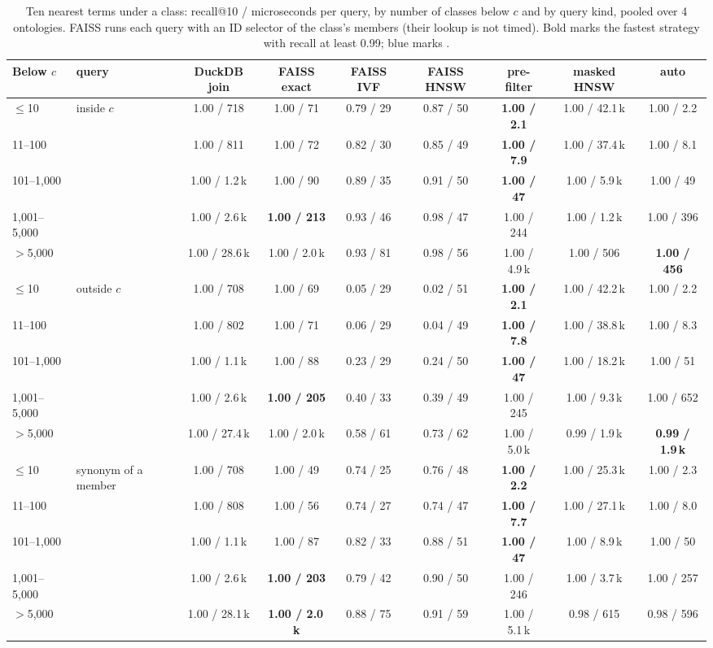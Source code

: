 \begin{table}[t]
\caption{Ten nearest terms under a class: recall@10 / microseconds per query, by number of classes below $c$ and by query kind, pooled over 4 ontologies. FAISS runs each query with an ID selector of the class's members (their lookup is not timed). Bold marks the fastest strategy with recall at least 0.99; blue marks \sys{}.}
\label{tab-filtered}
\small
\begin{tabular}{@{}llccccccc@{}}
\toprule
Below $c$ & query & DuckDB join & FAISS exact & FAISS IVF & FAISS HNSW & pre-filter & masked HNSW & auto \\
\midrule
$\le$10 & inside $c$ & 1.00 / 718 & 1.00 / 71 & 0.79 / 29 & 0.87 / 50 & \cellcolor{ours}\textbf{1.00 / 2.1} & 1.00 / 42.1\,k & 1.00 / 2.2 \\
11--100 &  & 1.00 / 811 & 1.00 / 72 & 0.82 / 30 & 0.85 / 49 & \cellcolor{ours}\textbf{1.00 / 7.9} & 1.00 / 37.4\,k & 1.00 / 8.1 \\
101--1,000 &  & 1.00 / 1.2\,k & 1.00 / 90 & 0.89 / 35 & 0.91 / 50 & \cellcolor{ours}\textbf{1.00 / 47} & 1.00 / 5.9\,k & 1.00 / 49 \\
1,001--5,000 &  & 1.00 / 2.6\,k & \textbf{1.00 / 213} & 0.93 / 46 & 0.98 / 47 & 1.00 / 244 & 1.00 / 1.2\,k & 1.00 / 396 \\
$>$5,000 &  & 1.00 / 28.6\,k & 1.00 / 2.0\,k & 0.93 / 81 & 0.98 / 56 & 1.00 / 4.9\,k & 1.00 / 506 & \cellcolor{ours}\textbf{1.00 / 456} \\
\midrule
$\le$10 & outside $c$ & 1.00 / 708 & 1.00 / 69 & 0.05 / 29 & 0.02 / 51 & \cellcolor{ours}\textbf{1.00 / 2.1} & 1.00 / 42.2\,k & 1.00 / 2.2 \\
11--100 &  & 1.00 / 802 & 1.00 / 71 & 0.06 / 29 & 0.04 / 49 & \cellcolor{ours}\textbf{1.00 / 7.8} & 1.00 / 38.8\,k & 1.00 / 8.3 \\
101--1,000 &  & 1.00 / 1.1\,k & 1.00 / 88 & 0.23 / 29 & 0.24 / 50 & \cellcolor{ours}\textbf{1.00 / 47} & 1.00 / 18.2\,k & 1.00 / 51 \\
1,001--5,000 &  & 1.00 / 2.6\,k & \textbf{1.00 / 205} & 0.40 / 33 & 0.39 / 49 & 1.00 / 245 & 1.00 / 9.3\,k & 1.00 / 652 \\
$>$5,000 &  & 1.00 / 27.4\,k & 1.00 / 2.0\,k & 0.58 / 61 & 0.73 / 62 & 1.00 / 5.0\,k & 0.99 / 1.9\,k & \cellcolor{ours}\textbf{0.99 / 1.9\,k} \\
\midrule
$\le$10 & synonym of a member & 1.00 / 708 & 1.00 / 49 & 0.74 / 25 & 0.76 / 48 & \cellcolor{ours}\textbf{1.00 / 2.2} & 1.00 / 25.3\,k & 1.00 / 2.3 \\
11--100 &  & 1.00 / 808 & 1.00 / 56 & 0.74 / 27 & 0.74 / 47 & \cellcolor{ours}\textbf{1.00 / 7.7} & 1.00 / 27.1\,k & 1.00 / 8.0 \\
101--1,000 &  & 1.00 / 1.1\,k & 1.00 / 87 & 0.82 / 33 & 0.88 / 51 & \cellcolor{ours}\textbf{1.00 / 47} & 1.00 / 8.9\,k & 1.00 / 50 \\
1,001--5,000 &  & 1.00 / 2.6\,k & \textbf{1.00 / 203} & 0.79 / 42 & 0.90 / 50 & 1.00 / 246 & 1.00 / 3.7\,k & 1.00 / 257 \\
$>$5,000 &  & 1.00 / 28.1\,k & \textbf{1.00 / 2.0\,k} & 0.88 / 75 & 0.91 / 59 & 1.00 / 5.1\,k & 0.98 / 615 & 0.98 / 596 \\
\bottomrule
\end{tabular}
\end{table}
